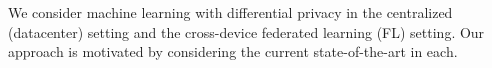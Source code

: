 \documentclass{article}
\begin{document}


We consider machine learning with differential privacy in the centralized (datacenter) setting and the cross-device federated learning (FL) setting. Our approach is motivated by considering the current state-of-the-art in each.
\end{document}
